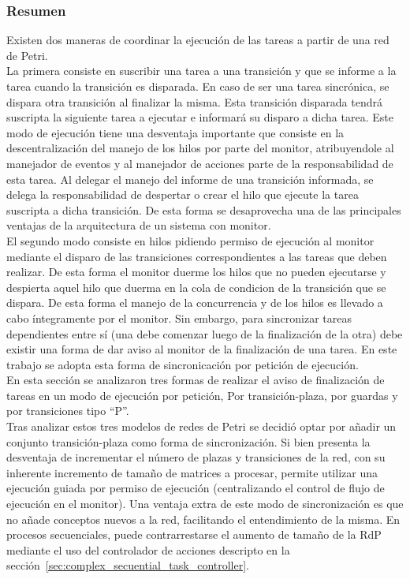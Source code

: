 \subsubsection{Resumen}
\label{sec:resumen_sincronizacion}
Existen dos maneras de coordinar la ejecución de las tareas a partir de una red
de Petri.\\ 
La primera consiste en suscribir una tarea a una transición y que se
informe a la tarea cuando la transición es disparada. En caso de ser
una tarea sincrónica, se dispara otra transición al finalizar la misma. Esta
transición disparada tendrá suscripta la siguiente tarea a ejecutar e informará
su disparo a dicha tarea. Este modo de ejecución tiene una desventaja
importante que consiste en la descentralización del manejo de los hilos por
parte del monitor, atribuyendole al manejador de eventos y al manejador de
acciones parte de la responsabilidad de esta tarea. Al delegar el manejo del
informe de una transición informada, se delega la responsabilidad de
despertar o crear el hilo que ejecute la tarea suscripta a dicha transición. De
esta forma se desaprovecha una de las principales ventajas de la arquitectura
de un sistema con monitor.\\
El segundo modo consiste en hilos pidiendo permiso de ejecución al monitor
mediante el disparo de las transiciones correspondientes a las tareas que deben
realizar. De esta forma el monitor duerme los hilos que no pueden ejecutarse y
despierta aquel hilo que duerma en la cola de condicion de la
transición que se dispara. De esta forma el manejo de la concurrencia y de los
hilos es llevado a cabo íntegramente por el monitor. Sin embargo, para
sincronizar tareas dependientes entre sí (una debe comenzar luego de la
finalización de la otra) debe existir una forma de dar aviso al monitor de la
finalización de una tarea. En este trabajo se adopta esta forma de
sincronicación por petición de ejecución.\\
En esta sección se analizaron tres formas de realizar el aviso de finalización
de tareas en un modo de ejecución por petición, Por transición-plaza, por
guardas y por transiciones tipo ``P''.\\
 Tras analizar estos tres modelos de redes de Petri se decidió optar por añadir
 un conjunto transición-plaza como forma de sincronización. Si bien presenta la
 desventaja de incrementar el número de plazas y transiciones de la red, con su
 inherente incremento de tamaño de matrices a procesar, permite utilizar una
 ejecución guiada por permiso de ejecución (centralizando el control de flujo
 de ejecución en el monitor). Una ventaja extra de
 este modo de sincronización es que no añade conceptos nuevos a la red,
 facilitando el entendimiento de la misma. En procesos secuenciales, puede
 contrarrestarse el aumento de tamaño de la RdP mediante el uso del
 controlador de acciones descripto en la
 sección~\ref{sec:complex_secuential_task_controller}.
 
 
 
 
 
